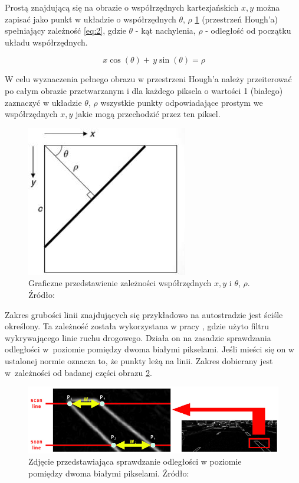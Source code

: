 Prostą znajdującą się na obrazie o współrzędnych kartezjańskich ${x,y}$ można zapisać jako punkt w układzie o współrzędnych $\theta$, $\rho$ \ref{fig:rotheta} (przestrzeń Hough'a) spełniający zależność \eqref{eq:2}, gdzie $\theta$ - kąt nachylenia, $\rho$ - odległość od początku układu współrzędnych.

\begin{equation}
\,x\cos(\theta )+\,y\sin(\theta )=\rho \label{eq:2}
\end{equation}


W celu wyznaczenia pełnego obrazu w przestrzeni Hough'a należy przeiterować po całym obrazie przetwarzanym i dla każdego piksela o wartości 1 (białego) zaznaczyć w układzie $\theta$, $\rho$ wszystkie punkty odpowiadające prostym we współrzędnych ${x,y}$ jakie mogą przechodzić przez ten piksel.

\begin{figure}
	\centering
	\includegraphics[scale=0.8]{hough_rotheta.png}
	\caption{Graficzne przedstawienie zależności współrzędnych ${x,y}$ i $\theta$, $\rho$. Źródło: \cite{hough_rotheta}}
	\label{fig:rotheta}
\end{figure}

Zakres grubości linii znajdujących się przykładowo na autostradzie jest ściśle określony. 
Ta zależność została wykorzystana w pracy \cite{4}, gdzie użyto filtru wykrywającego linie ruchu drogowego. Działa on na zasadzie sprawdzania odległości w~poziomie pomiędzy dwoma białymi pikselami. Jeśli mieści się on w ustalonej normie oznacza to, że punkty leżą na linii.
Zakres dobierany jest w~zależności od badanej części obrazu \ref{fig:lmps_sobe}. 



\begin{figure}
	\centering
	\includegraphics[scale=0.6]{lmps_sobe.png}
	\caption{Zdjęcie przedstawiająca sprawdzanie odległości w poziomie pomiędzy dwoma białymi pikselami. Źródło: \cite{4}}
	\label{fig:lmps_sobe}
\end{figure}

